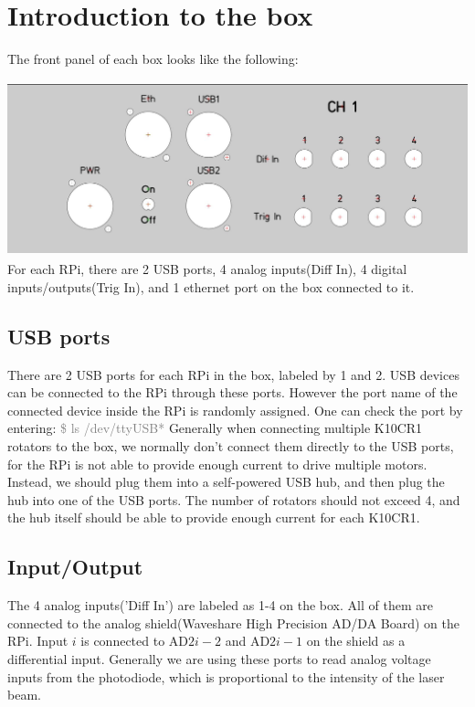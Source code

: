 \documentclass{article}
\begin{document}
\section{Introduction to the box}
The front panel of each box looks like the following:

\includegraphics[height=2in]{box1.JPG}\newline
For each RPi, there are 2 USB ports, 4 analog inputs(Diff In), 4 digital inputs/outputs(Trig In), and 1 ethernet port on the box connected to it.

\subsection{USB ports}

There are 2 USB ports for each RPi in the box, labeled by 1 and 2. USB devices can be connected to the RPi through these ports. However the port name of the connected device inside the RPi is randomly assigned. One can check the port by entering:\newline
\textcolor{gray}{\$ ls /dev/ttyUSB*}\newline
Generally when connecting multiple K10CR1 rotators to the box, we normally don't connect them directly to the USB ports, for the RPi is not able to provide enough current to drive multiple motors. Instead, we should plug them into a self-powered USB hub, and then plug the hub into one of the USB ports. The number of rotators should not exceed 4, and the hub itself should be able to provide enough current for each K10CR1.\newline
\subsection{Input/Output}
The 4 analog inputs('Diff In') are labeled as 1-4 on the box. All of them are connected to the analog shield(Waveshare High Precision AD/DA Board) on the RPi.  Input $i$ is connected to AD$2i-2$ and AD$2i-1$ on the shield as a differential input. Generally we are using these ports to read analog voltage inputs from the photodiode, which is proportional to the intensity of the laser beam.\newline
\end{document}
